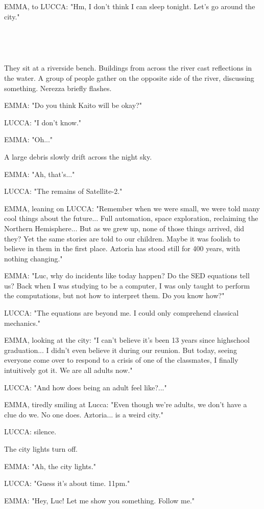 \documentclass[11pt]{article}
\begin{document}
EMMA, to LUCCA: "Hm, I don't think I can sleep tonight.
Let's go around the city."

\ 

\ 

They sit at a riverside bench.
Buildings from across the river cast reflections in the water.
A group of people gather on the opposite side of the river, discussing something.
Nerezza briefly flashes.

EMMA: "Do you think Kaito will be okay?"

LUCCA: "I don't know."

EMMA: "Oh..."

A large debris slowly drift across the night sky.

EMMA: "Ah, that's..."

LUCCA: "The remains of Satellite-2."

EMMA, leaning on LUCCA: "Remember when we were small, we were told many cool things about the future...
Full automation, space exploration, reclaiming the Northern Hemisphere...
But as we grew up, none of those things arrived, did they?
Yet the same stories are told to our children.
Maybe it was foolish to believe in them in the first place.
Aztoria has stood still for 400 years, with nothing changing."

EMMA: "Luc, why do incidents like today happen?
Do the SED equations tell us?
Back when I was studying to be a computer, I was only taught to perform the computations, but not how to interpret them.
Do you know how?"

LUCCA: "The equations are beyond me.
I could only comprehend classical mechanics."

EMMA, looking at the city: "I can't believe it's been 13 years since highschool graduation...
I didn't even believe it during our reunion.
But today, seeing everyone come over to respond to a crisis of one of the classmates, I finally intuitively got it.
We are all adults now."

LUCCA: "And how does being an adult feel like?..."

EMMA, tiredly smiling at Lucca: "Even though we're adults, we don't have a clue do we. 
No one does.
Aztoria... is a weird city."

LUCCA: silence.

The city lights turn off.

EMMA: "Ah, the city lights."

LUCCA: "Guess it's about time. 11pm."

EMMA: "Hey, Luc! Let me show you something. Follow me."
\end{document}
